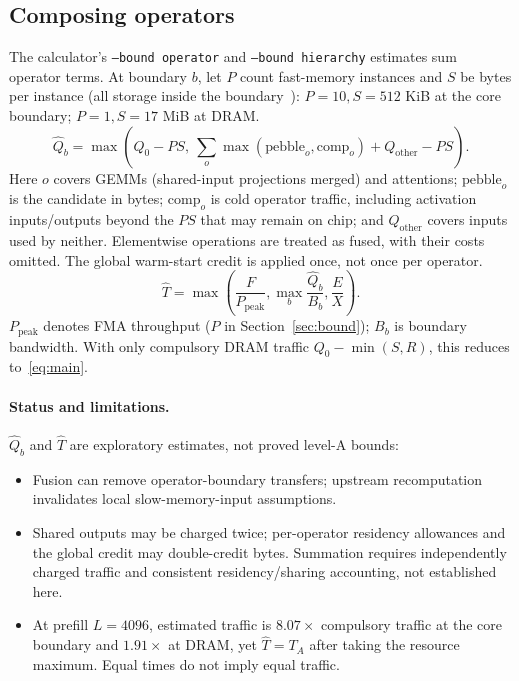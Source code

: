 \documentclass[11pt]{article}
\theoremstyle{definition}
\theoremstyle{remark}
\begin{document}
\subsection{Composing operators}\label{sec:compose}
The calculator's \texttt{--bound operator} and \texttt{--bound hierarchy} estimates sum operator terms.
At boundary $b$, let $P$ count fast-memory instances and $S$ be bytes per instance
(all storage inside the boundary~\cite{savage}): $P=10,S=512$ KiB at the core boundary;
$P=1,S=17$ MiB at DRAM.
\begin{equation}\label{eq:operator}
\widehat Q_b=\max\left(Q_0-PS,\ \sum_o\max(\mathrm{pebble}_o,\mathrm{comp}_o)+Q_{\mathrm{other}}-PS\right).
\end{equation}
Here $o$ covers GEMMs (shared-input projections merged) and attentions; $\mathrm{pebble}_o$ is the
candidate in bytes; $\mathrm{comp}_o$ is cold operator traffic, including activation inputs/outputs
beyond the $PS$ that may remain on chip; and $Q_{\mathrm{other}}$ covers inputs used by neither.
Elementwise operations are treated as fused, with their costs omitted. The global warm-start credit
is applied once, not once per operator.
\begin{equation}\label{eq:hier}
\widehat T=\max\left(\frac{F}{P_{\mathrm{peak}}},\max_b\frac{\widehat Q_b}{B_b},\frac{E}{X}\right).
\end{equation}
$P_{\mathrm{peak}}$ denotes FMA throughput ($P$ in Section~\ref{sec:bound}); $B_b$ is boundary bandwidth.
With only compulsory DRAM traffic $Q_0-\min(S,R)$, this reduces to~\eqref{eq:main}.

\paragraph{Status and limitations.}
$\widehat Q_b$ and $\widehat T$ are exploratory estimates, not proved level-A bounds:
\begin{itemize}[nosep]
\item Fusion can remove operator-boundary transfers; upstream recomputation invalidates local slow-memory-input assumptions.
\item Shared outputs may be charged twice; per-operator residency allowances and the global credit may double-credit bytes.
Summation requires independently charged traffic and consistent residency/sharing accounting, not established here.
\item At prefill $L=4096$, estimated traffic is $8.07\times$ compulsory traffic at the core boundary and
$1.91\times$ at DRAM, yet $\widehat T=T_A$ after taking the resource maximum. Equal times do not imply equal traffic.
\end{itemize}
\end{document}
